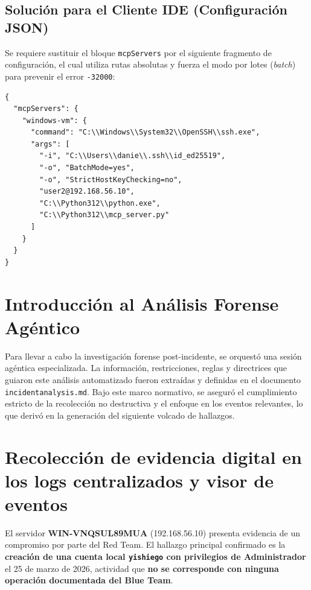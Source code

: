 \subsection*{Solución para el Cliente IDE (Configuración JSON)}
Se requiere sustituir el bloque \texttt{mcpServers} por el siguiente fragmento de configuración, el cual utiliza rutas absolutas y fuerza el modo por lotes (\textit{batch}) para prevenir el error \texttt{-32000}:
\begin{lstlisting}
{
  "mcpServers": {
    "windows-vm": {
      "command": "C:\\Windows\\System32\\OpenSSH\\ssh.exe",
      "args": [
        "-i", "C:\\Users\\danie\\.ssh\\id_ed25519",
        "-o", "BatchMode=yes",
        "-o", "StrictHostKeyChecking=no",
        "user2@192.168.56.10",
        "C:\\Python312\\python.exe",
        "C:\\Python312\\mcp_server.py"
      ]
    }
  }
}
\end{lstlisting}

\section{Introducción al Análisis Forense Agéntico}
Para llevar a cabo la investigación forense post-incidente, se orquestó una sesión agéntica especializada. La información, restricciones, reglas y directrices que guiaron este análisis automatizado fueron extraídas y definidas en el documento \texttt{incident}\allowbreak\texttt{analysis.md}. Bajo este marco normativo, se aseguró el cumplimiento estricto de la recolección no destructiva y el enfoque en los eventos relevantes, lo que derivó en la generación del siguiente volcado de hallazgos.

\section[Recolección de Evidencia en Logs]{Recolección de evidencia digital en los logs centralizados y visor de eventos}
\label{sec:recoleccion_evidencia}

El servidor \textbf{WIN-VNQSUL89MUA} (192.168.56.10) presenta evidencia de un compromiso por parte del Red Team. El hallazgo principal confirmado es la \textbf{creación de una cuenta local \texttt{yishiego} con privilegios de Administrador} el 25 de marzo de 2026, actividad que \textbf{no se corresponde con ninguna operación documentada del Blue Team}.

